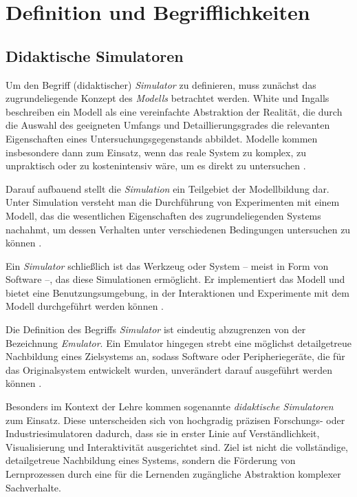 \section{Definition und Begrifflichkeiten}

\subsection{Didaktische Simulatoren}
Um den Begriff (didaktischer) \textit{Simulator} zu definieren, muss zunächst das zugrundeliegende Konzept des \textit{Modells} betrachtet werden. White und Ingalls beschreiben ein Modell als eine vereinfachte Abstraktion der Realität, die durch die Auswahl des geeigneten Umfangs und Detaillierungsgrades die relevanten Eigenschaften eines Untersuchungsgegenstands abbildet. Modelle kommen insbesondere dann zum Einsatz, wenn das reale System zu komplex, zu unpraktisch oder zu kostenintensiv wäre, um es direkt zu untersuchen \parencite[S.~12]{white_introduction_2009}\parencite[S.~5]{banks_what_2008}.

Darauf aufbauend stellt die \textit{Simulation} ein Teilgebiet der Modellbildung dar. Unter Simulation versteht man die Durchführung von Experimenten mit einem Modell, das die wesentlichen Eigenschaften des zugrundeliegenden Systems nachahmt, um dessen Verhalten unter verschiedenen Bedingungen untersuchen zu können \parencite[S.~12]{white_introduction_2009}\parencite[S.~6]{banks_what_2008}.

Ein \textit{Simulator} schließlich ist das Werkzeug oder System -- meist in Form von Software --, das diese Simulationen ermöglicht. Er implementiert das Modell und bietet eine Benutzungsumgebung, in der Interaktionen und Experimente mit dem Modell durchgeführt werden können \parencite[S.~304f]{duran_what_2020}.

Die Definition des Begriffs \textit{Simulator} ist eindeutig abzugrenzen von der Bezeichnung \textit{Emulator}. Ein Emulator hingegen strebt eine möglichst detailgetreue Nachbildung eines Zielsystems an, sodass Software oder Peripheriegeräte, die für das Originalsystem entwickelt wurden, unverändert darauf ausgeführt werden können \parencite[S.~1683]{mcgregor_relationship_2002}.

Besonders im Kontext der Lehre kommen sogenannte \textit{didaktische Simulatoren} zum Einsatz. Diese unterscheiden sich von hochgradig präzisen Forschungs- oder Industriesimulatoren dadurch, dass sie in erster Linie auf Verständlichkeit, Visualisierung und Interaktivität ausgerichtet sind. Ziel ist nicht die vollständige, detailgetreue Nachbildung eines Systems, sondern die Förderung von Lernprozessen durch eine für die Lernenden zugängliche Abstraktion komplexer Sachverhalte.\parencite[S.~256]{muller_entwicklung_2020}\parencite[S.~1]{nystrom_teaching_2024}

